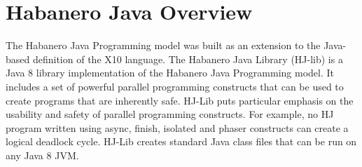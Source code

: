 \section{Habanero Java Overview}
The Habanero Java Programming model was built as an extension to the Java-based definition of the X10 language. The Habanero Java Library (HJ-lib) is a Java 8 library implementation of the Habanero Java Programming model. It includes a set of powerful parallel programming constructs that can be used to create programs that are inherently safe. HJ-Lib puts particular emphasis on the usability and safety of parallel programming constructs. For example, no HJ program written using async, finish, isolated and phaser constructs can create a logical deadlock cycle. HJ-Lib creates standard Java class files that can be run on any Java 8 JVM. 

